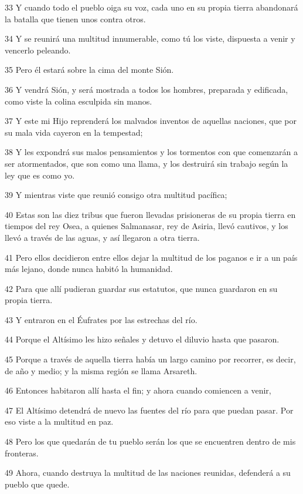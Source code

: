 \par 33 Y cuando todo el pueblo oiga su voz, cada uno en su propia tierra abandonará la batalla que tienen unos contra otros.
\par 34 Y se reunirá una multitud innumerable, como tú los viste, dispuesta a venir y vencerlo peleando.
\par 35 Pero él estará sobre la cima del monte Sión.
\par 36 Y vendrá Sión, y será mostrada a todos los hombres, preparada y edificada, como viste la colina esculpida sin manos.
\par 37 Y este mi Hijo reprenderá los malvados inventos de aquellas naciones, que por su mala vida cayeron en la tempestad;
\par 38 Y les expondrá sus malos pensamientos y los tormentos con que comenzarán a ser atormentados, que son como una llama, y ​​los destruirá sin trabajo según la ley que es como yo.
\par 39 Y mientras viste que reunió consigo otra multitud pacífica;
\par 40 Estas son las diez tribus que fueron llevadas prisioneras de su propia tierra en tiempos del rey Osea, a quienes Salmanasar, rey de Asiria, llevó cautivos, y los llevó a través de las aguas, y así llegaron a otra tierra.
\par 41 Pero ellos decidieron entre ellos dejar la multitud de los paganos e ir a un país más lejano, donde nunca habitó la humanidad.
\par 42 Para que allí pudieran guardar sus estatutos, que nunca guardaron en su propia tierra.
\par 43 Y entraron en el Éufrates por las estrechas del río.
\par 44 Porque el Altísimo les hizo señales y detuvo el diluvio hasta que pasaron.
\par 45 Porque a través de aquella tierra había un largo camino por recorrer, es decir, de año y medio; y la misma región se llama Arsareth.
\par 46 Entonces habitaron allí hasta el fin; y ahora cuando comiencen a venir,
\par 47 El Altísimo detendrá de nuevo las fuentes del río para que puedan pasar. Por eso viste a la multitud en paz.
\par 48 Pero los que quedarán de tu pueblo serán los que se encuentren dentro de mis fronteras.
\par 49 Ahora, cuando destruya la multitud de las naciones reunidas, defenderá a su pueblo que quede.
